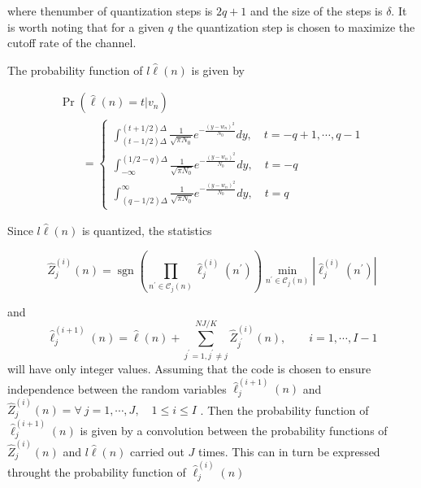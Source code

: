 \documentclass[11pt, oneside, dvipdfmx]{book}
\begin{document}
where thenumber of quantization steps is $2q+1$ and the size of the steps is $\delta$. 
It is worth noting that for a given $q$ the quantization step is chosen to maximize the cutoff rate of the channel.

The probability function of ${l}{\hat{\ell}(n)}$ is given by

\begin{equation}
\begin{array}{l}{\operatorname{Pr}\left(\hat{\ell}(n)=t | v_{n}\right)} \\ {\qquad=\left\{\begin{array}{l}{\int_{(t-1 / 2) \Delta}^{(t+1 / 2) \Delta} \frac{1}{\sqrt{\pi N_{0}}} e^{-\frac{\left(y-w_{n}\right)^{2}}{N_{0}}} d y, \quad t=-q+1, \cdots, q-1} \\ {\int_{-\infty}^{(1 / 2-q) \Delta} \frac{1}{\sqrt{\pi N_{0}}} e^{-\frac{\left(y-w_{n}\right)^{2}}{N_{0}}} d y, \quad t=-q} \\ {\int_{(q-1 / 2) \Delta}^{\infty} \frac{1}{\sqrt{\pi N_{0}}} e^{-\frac{\left(y-w_{n}\right)^{2}}{N_{0}}} d y,} \quad  {t=q}\end{array}\right.}\end{array}
\end{equation}

Since ${l}{\hat{\ell}(n)}$ is quantized, the statistics 

\begin{equation}
\hat{Z}_{j}^{(i)}(n)=\operatorname{sgn}\left(\prod_{n^{\prime} \in \mathcal{C}_{j}(n)} \hat{\ell}_{j}^{(i)}\left(n^{\prime}\right)\right) \min _{n^{\prime} \in \mathcal{C}_{j}(n)}\left|\hat{\ell}_{j}^{(i)}\left(n^{\prime}\right)\right|
\end{equation}

and
\begin{equation}
\hat{\ell}_{j}^{(i+1)}(n)=\hat{\ell}(n)+\sum_{j^{\prime}=1, j^{\prime} \neq j}^{NJ / K} \hat{Z}_{j^{\prime}}^{(i)}(n), \qquad i=1, \cdots, I-1
\end{equation}
will have only integer values. Assuming that the code is chosen to ensure independence between the random variables $\hat{\ell}_{j}^{(i+1)}(n)$ and $\hat{Z}_{j}^{(i)}(n)=	\forall ~ j=1, \cdots, J, \quad 1 \leq i \leq I$ . Then the probability function of $\hat{\ell}_{j}^{(i+1)}(n)$ is given by a convolution between the probability functions of $\hat{Z}_{j}^{(i)}(n)$ and ${l}{\hat{\ell}(n)}$ carried out $J$ times. This can in turn be expressed throught the probability function of $\hat{\ell}_{j}^{(i)}(n)$
\end{document}
